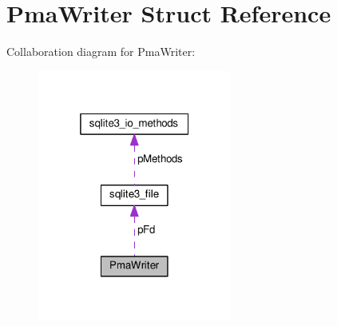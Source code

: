 \hypertarget{structPmaWriter}{}\section{Pma\+Writer Struct Reference}
\label{structPmaWriter}


Collaboration diagram for Pma\+Writer\+:\nopagebreak
\begin{figure}[H]
\begin{center}
\leavevmode
\includegraphics[width=181pt]{structPmaWriter__coll__graph}
\end{center}
\end{figure}
